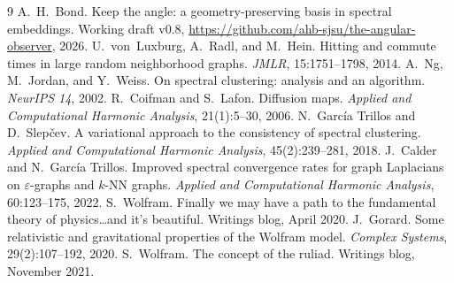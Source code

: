 \documentclass[11pt]{article}
\begin{document}
\begin{thebibliography}{9}
 A.~H.~Bond. Keep the angle: a geometry-preserving basis in
spectral embeddings. Working draft v0.8,
\url{https://github.com/ahb-sjsu/the-angular-observer}, 2026.
 U.~von~Luxburg, A.~Radl, and M.~Hein. Hitting and
commute times in large random neighborhood graphs. \emph{JMLR},
15:1751--1798, 2014.
 A.~Ng, M.~Jordan, and Y.~Weiss. On spectral clustering:
analysis and an algorithm. \emph{NeurIPS 14}, 2002.
 R.~Coifman and S.~Lafon. Diffusion maps. \emph{Applied
and Computational Harmonic Analysis}, 21(1):5--30, 2006.
 N.~Garc\'ia Trillos and D.~Slep\v{c}ev. A
variational approach to the consistency of spectral clustering. \emph{Applied
and Computational Harmonic Analysis}, 45(2):239--281, 2018.
 J.~Calder and N.~Garc\'ia Trillos. Improved spectral
convergence rates for graph Laplacians on $\varepsilon$-graphs and $k$-NN
graphs. \emph{Applied and Computational Harmonic Analysis}, 60:123--175, 2022.
 S.~Wolfram. Finally we may have a path to the
fundamental theory of physics\ldots and it's beautiful. Writings blog, April
2020.
 J.~Gorard. Some relativistic and gravitational properties
of the Wolfram model. \emph{Complex Systems}, 29(2):107--192, 2020.
 S.~Wolfram. The concept of the ruliad. Writings blog,
November 2021.
\end{thebibliography}
\end{document}
